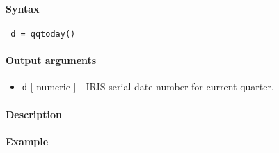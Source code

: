 


	\paragraph{Syntax}
 
 \begin{verbatim}
 d = qqtoday()
 \end{verbatim}
 
 \paragraph{Output arguments}
 
 \begin{itemize}
 \item
   \texttt{d} {[} numeric {]} - IRIS serial date number for current
   quarter.
 \end{itemize}
 
 \paragraph{Description}
 
 \paragraph{Example}


